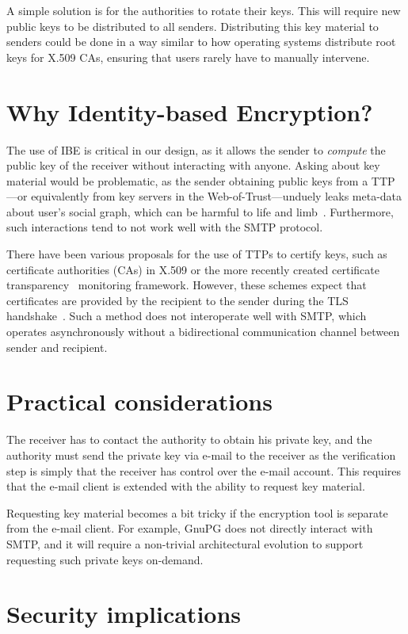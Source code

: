 \documentclass[twoside,letterpaper]{sig-alternate}
\begin{document}
A simple solution is for the authorities to rotate their keys. This
will require new public keys to be distributed to all senders.
Distributing this key material to senders could be done in a way
similar to how operating systems distribute root keys for X.509
CAs, ensuring that users rarely have to manually intervene.


\section{Why Identity-based Encryption?}

The use of IBE is critical in our design, as it allows the sender to
{\em compute} the public key of the receiver without interacting with
anyone.  Asking about key material would be problematic, as the sender
obtaining public keys from a TTP---or equivalently from key servers in
the Web-of-Trust---unduely leaks meta-data about user's social graph,
which can be harmful to life and limb~\cite{skynet}.  Furthermore,
such interactions tend to not work well with the SMTP protocol.

There have been various proposals for the use of TTPs to certify keys,
such as certificate authorities (CAs) in X.509 or the more recently
created certificate transparency~\cite{certtrans} monitoring
framework.  However, these schemes expect that certificates are
provided by the recipient to the sender during the TLS
handshake~\cite{tls}.  Such a method does not interoperate well with
SMTP, which operates asynchronously without a bidirectional
communication channel between sender and recipient.


\section{Practical considerations}

The receiver has to contact the authority to obtain his private
key, and the authority must send the private key via e-mail to
the receiver as the verification step is simply that the receiver
has control over the e-mail account.  This requires that the
e-mail client is extended with the ability to request key material.

Requesting key material becomes a bit tricky if the encryption tool is
separate from the e-mail client.  For example, GnuPG does not directly
interact with SMTP, and it will require a non-trivial architectural
evolution to support requesting such private keys on-demand.


\section{Security implications}
\end{document}
